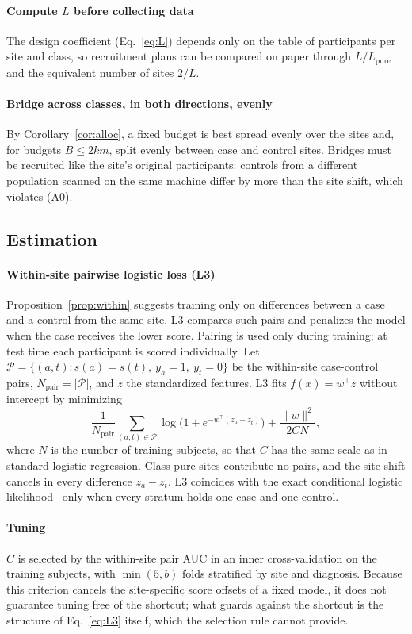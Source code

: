 \paragraph{Compute $L$ before collecting data} The design coefficient (Eq.~\ref{eq:L}) depends only on the table of participants per site and class, so recruitment plans can be compared on paper through $L/L_{\mathrm{pure}}$ and the equivalent number of sites $2/L$.

\paragraph{Bridge across classes, in both directions, evenly} By Corollary~\ref{cor:alloc}, a fixed budget is best spread evenly over the sites and, for budgets $B\le2km$, split evenly between case and control sites. Bridges must be recruited like the site's original participants: controls from a different population scanned on the same machine differ by more than the site shift, which violates (A0).

\subsection{Estimation}\label{sec:estimation}

\paragraph{Within-site pairwise logistic loss (L3)} Proposition~\ref{prop:within} suggests training only on differences between a case and a control from the same site. L3 compares such pairs and penalizes the model when the case receives the lower score. Pairing is used only during training; at test time each participant is scored individually. Let $\mathcal{P}=\{(a,t): s(a)=s(t),\ y_a=1,\ y_t=0\}$ be the within-site case-control pairs, $N_{\mathrm{pair}}=|\mathcal{P}|$, and $z$ the standardized features. L3 fits $f(x)=w^\top z$ without intercept by minimizing
\begin{equation}
\frac1{N_{\mathrm{pair}}}\sum_{(a,t)\in\mathcal{P}}\log\!\big(1+e^{-w^\top(z_a-z_t)}\big)+\frac{\|w\|^2}{2CN},\label{eq:L3}
\end{equation}
where $N$ is the number of training subjects, so that $C$ has the same scale as in standard logistic regression. Class-pure sites contribute no pairs, and the site shift cancels in every difference $z_a-z_t$. L3 coincides with the exact conditional logistic likelihood~\cite{avalos2015} only when every stratum holds one case and one control.

\paragraph{Tuning} $C$ is selected by the within-site pair AUC in an inner cross-validation on the training subjects, with $\min(5,b)$ folds stratified by site and diagnosis. Because this criterion cancels the site-specific score offsets of a fixed model, it does not guarantee tuning free of the shortcut; what guards against the shortcut is the structure of Eq.~\eqref{eq:L3} itself, which the selection rule cannot provide.

